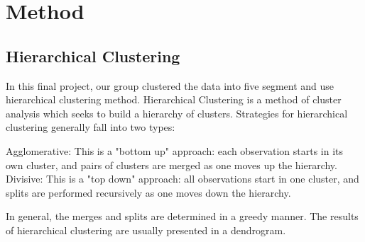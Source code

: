 \section{Method}

\subsection{Hierarchical Clustering}
In this final project, our group clustered the data into five segment and use hierarchical clustering method. Hierarchical Clustering is a method of cluster analysis which seeks to build a hierarchy of clusters. Strategies for hierarchical clustering generally fall into two types:

    Agglomerative: This is a "bottom up" approach: each observation starts in its own cluster, and pairs of clusters are merged as one moves up the hierarchy.
    Divisive: This is a "top down" approach: all observations start in one cluster, and splits are performed recursively as one moves down the hierarchy.

In general, the merges and splits are determined in a greedy manner. The results of hierarchical clustering are usually presented in a dendrogram.
